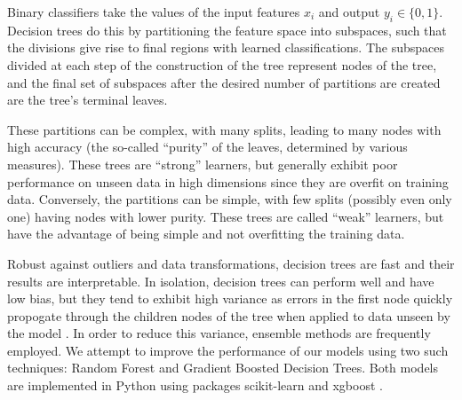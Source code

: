 Binary classifiers take the values of the input features $x_{i}$ and output $y_{i} \in \{0,1\}$. Decision trees do this by partitioning the feature space into subspaces, such that the divisions give rise to final regions with learned classifications. The subspaces divided at each step of the construction of the tree represent nodes of the tree, and the final set of subspaces after the desired number of partitions are created are the tree's terminal leaves.

These partitions can be complex, with many splits, leading to many nodes with high accuracy (the so-called ``purity'' of the leaves, determined by various measures). These trees are ``strong'' learners, but generally exhibit poor performance on unseen data in high dimensions since they are overfit on training data. Conversely, the partitions can be simple, with few splits (possibly even only one) having nodes with lower purity. These trees are called ``weak'' learners, but have the advantage of being simple and not overfitting the training data.

Robust against outliers and data transformations, decision trees are fast and their results are interpretable. In isolation, decision trees can perform well and have low bias, but they tend to exhibit high variance as errors in the first node quickly propogate through the children nodes of the tree when applied to data unseen by the model \cite{James_2013}. In order to reduce this variance, ensemble methods are frequently employed. We attempt to improve the performance of our models using two such techniques: Random Forest and Gradient Boosted Decision Trees. Both models are implemented in Python using packages scikit-learn \cite{scikit-learn} and xgboost \cite{Chen_2016}.